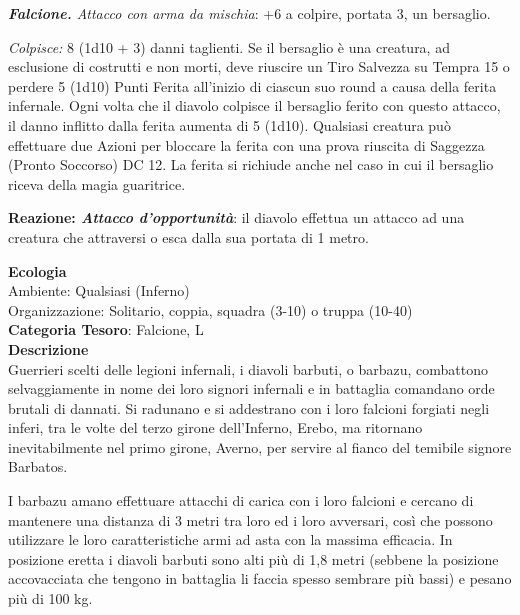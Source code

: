 \begin{multicols}{2}
{\emph{\textbf{Falcione.} Attacco con arma da mischia}: +6 a colpire, portata 3, un bersaglio.

\emph{Colpisce:} 8 (1d10 + 3) danni taglienti. Se il bersaglio è una creatura, ad esclusione di costrutti e non morti, deve riuscire un Tiro Salvezza su Tempra 15 o perdere 5 (1d10) Punti Ferita all'inizio di ciascun suo round a causa della ferita infernale. Ogni volta che il diavolo colpisce il bersaglio ferito con questo attacco, il danno inflitto dalla ferita aumenta di 5 (1d10). Qualsiasi creatura può effettuare due Azioni per bloccare la ferita con una prova riuscita di Saggezza (Pronto Soccorso) DC 12. La ferita si richiude anche nel caso in cui il bersaglio riceva della magia guaritrice.

\textbf{Reazione: \emph{Attacco d'opportunità}}: il diavolo effettua un attacco ad una creatura che attraversi o esca dalla sua portata di 1 metro.

\textbf{Ecologia}\\
Ambiente: Qualsiasi (Inferno)\\
Organizzazione: Solitario, coppia, squadra (3-10) o truppa (10-40)\\
\textbf{Categoria Tesoro}: Falcione, L\\
\textbf{Descrizione}\\
Guerrieri scelti delle legioni infernali, i diavoli barbuti, o barbazu, combattono selvaggiamente in nome dei loro signori infernali e in battaglia comandano orde brutali di dannati. Si radunano e si addestrano con i loro falcioni forgiati negli inferi, tra le volte del terzo girone dell'Inferno, Erebo, ma ritornano inevitabilmente nel primo girone, Averno, per servire al fianco del temibile signore Barbatos.

I barbazu amano effettuare attacchi di carica con i loro falcioni e cercano di mantenere una distanza di 3 metri tra loro ed i loro avversari, così che possono utilizzare le loro caratteristiche armi ad asta con la massima efficacia. In posizione eretta i diavoli barbuti sono alti più di 1,8 metri (sebbene la posizione accovacciata che tengono in battaglia li faccia spesso sembrare più bassi) e pesano più di 100 kg.


}
\end{multicols}

